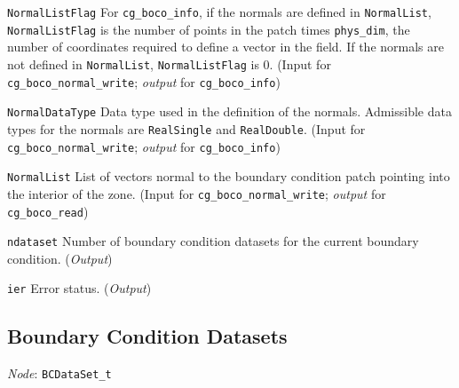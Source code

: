 \begin{Ventryi}{\texttt{NormalListFlag}}
      For \texttt{cg\_boco\_info}, if the normals are defined in
      \texttt{NormalList}, \texttt{NormalListFlag} is the number of points
      in the patch times \texttt{phys\_dim}, the number of coordinates
      required to define a vector in the field.
      If the normals are not defined in \texttt{NormalList},
      \texttt{NormalListFlag} is 0.
      (\textcolor{input}{Input} for \texttt{cg\_boco\_normal\_write};
      \textcolor{output}{\textit{output}} for \texttt{cg\_boco\_info})
\item [\texttt{NormalDataType}]
      Data type used in the definition of the normals.
      Admissible data types for the normals are \texttt{RealSingle} and
      \texttt{RealDouble}.
      (\textcolor{input}{Input} for \texttt{cg\_boco\_normal\_write};
      \textcolor{output}{\textit{output}} for \texttt{cg\_boco\_info})
\item [\texttt{NormalList}]
      List of vectors normal to the boundary condition patch pointing
      into the interior of the zone.
      (\textcolor{input}{Input} for \texttt{cg\_boco\_normal\_write};
      \textcolor{output}{\textit{output}} for \texttt{cg\_boco\_read})
\item [\texttt{ndataset}]
      Number of boundary condition datasets for the current boundary
      condition.
      (\textcolor{output}{\textit{Output}})
\item [\texttt{ier}]
      Error status.
      (\textcolor{output}{\textit{Output}})
\end{Ventryi}

\subsection{Boundary Condition Datasets}
\label{s:bcdataset}

\noindent
\textit{Node}: \texttt{BCDataSet\_t}

